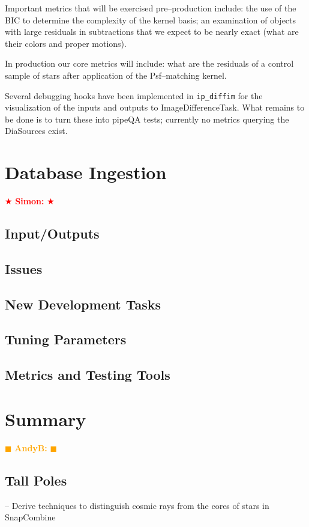 \documentclass[12pt]{article}
\newcommand{\becker} { \textcolor{orange} {
\ensuremath{\blacksquare} {\bf AndyB:}  
\ensuremath{\blacksquare} } }
\newcommand{\simon} { \textcolor{red} {
\ensuremath{\bigstar} {\bf Simon:}  
\ensuremath{\bigstar} } }
\begin{document}
Important metrics that will be exercised pre--production include: the
use of the BIC to determine the complexity of the kernel basis; an
examination of objects with large residuals in subtractions that we
expect to be nearly exact (what are their colors and proper motions).

In production our core metrics will include: what are the residuals of
a control sample of stars after application of the Psf--matching
kernel.

Several debugging hooks have been implemented in {\tt ip\_diffim} for
the visualization of the inputs and outputs to ImageDifferenceTask.
What remains to be done is to turn these into pipeQA tests; currently
no metrics querying the DiaSources exist.


\clearpage 
\section{Database Ingestion} \simon

\subsection{Input/Outputs}
\subsection{Issues}
\subsection{New Development Tasks}
\subsection{Tuning Parameters}
\subsection{Metrics and Testing Tools}


\clearpage 
\section{Summary} \becker

\subsection{Tall Poles}

-- Derive techniques to distinguish cosmic rays from the cores of stars in SnapCombine
\end{document}
